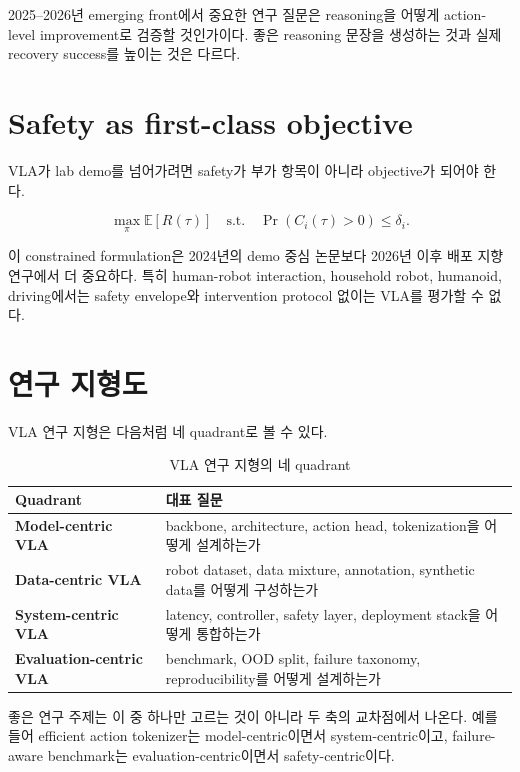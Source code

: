 2025--2026년 emerging front에서 중요한 연구 질문은 reasoning을 어떻게 action-level improvement로 검증할 것인가이다. 좋은 reasoning 문장을 생성하는 것과 실제 recovery success를 높이는 것은 다르다.

\section{Safety as first-class objective}

VLA가 lab demo를 넘어가려면 safety가 부가 항목이 아니라 objective가 되어야 한다.

\begin{equation}
  \max_\pi
  \mathbb{E}[R(\tau)]
  \quad
  \mathrm{s.t.}
  \quad
  \Pr(C_i(\tau)>0) \le \delta_i.
\end{equation}

이 constrained formulation은 2024년의 demo 중심 논문보다 2026년 이후 배포 지향 연구에서 더 중요하다. 특히 human-robot interaction, household robot, humanoid, driving에서는 safety envelope와 intervention protocol 없이는 VLA를 평가할 수 없다.

\section{연구 지형도}

VLA 연구 지형은 다음처럼 네 quadrant로 볼 수 있다.

\begin{table}[t]
  \centering
  \caption{VLA 연구 지형의 네 quadrant}
  \label{tab:vla_quadrants}
  \begin{tabularx}{\textwidth}{>{\bfseries}p{34mm}X}
    \toprule
    Quadrant & 대표 질문 \\
    \midrule
    Model-centric VLA & backbone, architecture, action head, tokenization을 어떻게 설계하는가 \\
    Data-centric VLA & robot dataset, data mixture, annotation, synthetic data를 어떻게 구성하는가 \\
    System-centric VLA & latency, controller, safety layer, deployment stack을 어떻게 통합하는가 \\
    Evaluation-centric VLA & benchmark, OOD split, failure taxonomy, reproducibility를 어떻게 설계하는가 \\
    \bottomrule
  \end{tabularx}
\end{table}

좋은 연구 주제는 이 중 하나만 고르는 것이 아니라 두 축의 교차점에서 나온다. 예를 들어 efficient action tokenizer는 model-centric이면서 system-centric이고, failure-aware benchmark는 evaluation-centric이면서 safety-centric이다.

